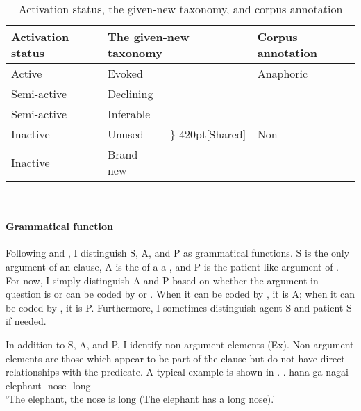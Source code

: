 \begin{table}
	\caption{Activation status, the given-new taxonomy, and corpus annotation}
	\label{ActStatusCorpus}
	\begin{center}
	\begin{tabular}{llll}
	\toprule
	Activation status & \multicolumn{2}{l}{The given-new taxonomy} & Corpus annotation \\
	\midrule
	Active & Evoked & & Anaphoric \\
	Semi-active & Declining &  & \\
	\rowcolor{gray!50!white}
	Semi-active & Inferable &  & \\
	\rowcolor{gray!50!white}
	Inactive & Unused & \rdelim\}{-4}{20pt}[Shared] & Non-\isi{anaphoric} \\
	\rowcolor{gray!50!white}
	Inactive & Brand-new & &  \\
	\bottomrule
	\end{tabular}\\
	\end{center}
\end{table}


\paragraph{Grammatical function}

Following  and ,
I distinguish S, A, and P as grammatical functions.
S is the only argument of an  clause,
A is the  of a a ,
and P is the patient-like argument of .
For now, I simply distinguish A and P based on whether the argument in question is or can be coded by  or .
When it can be coded by , it is A;
when it can be coded by , it is P.
Furthermore, I sometimes distinguish agent S and patient S if needed.

In addition to S, A, and P,
I identify non-argument elements (Ex).\label{FW:Cor:TopFoc:ExDef}
Non-argument elements are those which appear to be part of the clause but do not have direct relationships with the predicate.
A typical example is shown in \Next.
%
\exg.  hana-ga nagai \\
		elephant- nose- long \\
		`The elephant, the nose is long (The elephant has a long nose).' \hfill{\cite{mikami60}}

